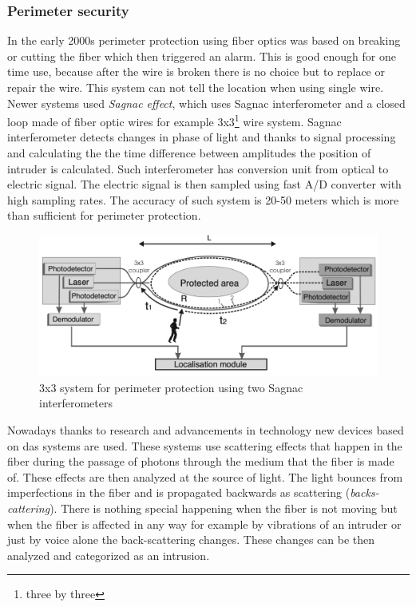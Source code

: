 \subsubsection{Perimeter security}\label{txt.perimeter.security}

In the early 2000s perimeter protection using fiber optics was based on breaking or cutting the fiber which then triggered an alarm. This is good enough for one time use, because after the wire is broken there is no choice but to replace or repair the wire. This system can not tell the location when using single wire. Newer systems used \textit{Sagnac effect}, which uses Sagnac interferometer and a closed loop made of fiber optic wires for example 3x3\footnote{three by three} wire system. Sagnac interferometer detects changes in phase of light and thanks to signal processing and calculating the the time difference between amplitudes the position of intruder is calculated. Such interferometer has conversion unit from optical to electric signal. The electric signal is then sampled using fast A/D converter with high sampling rates. The accuracy of such system is 20-50 meters which is more than sufficient for perimeter protection\cite{perimeterpolsko}. 

\begin{figure}
    \centering
    \includegraphics[width=\linewidth]{obrazky/sagnac_interrogator.png}
    \caption{3x3 system for perimeter protection using two Sagnac interferometers\cite{perimeterpolsko}}
    \label{fig:sagnac}
\end{figure}

Nowadays thanks to research and advancements in technology new devices based on \ac{das} systems are used. These systems use scattering effects that happen in the fiber during the passage of photons through the medium that the fiber is made of. These effects are then analyzed at the source of light. The light bounces from imperfections in the fiber and is propagated backwards as scattering (\textit{backs-cattering}). There is nothing special happening when the fiber is not moving but when the fiber is affected in any way for example by vibrations of an intruder or just by voice alone the back-scattering changes. These changes can be then analyzed and categorized as an intrusion.








